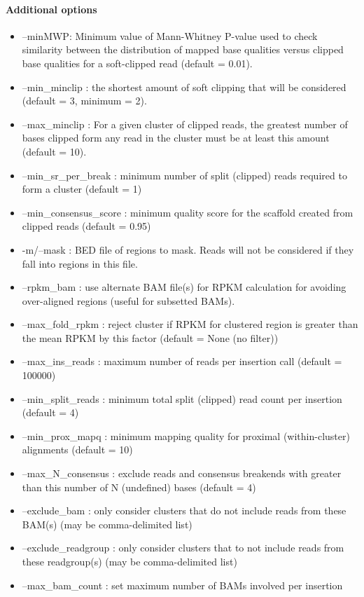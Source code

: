 \documentclass[letterpaper,11pt]{article}
\begin{document}
\paragraph{Additional options}
\begin{itemize}
\item --minMWP: Minimum value of Mann-Whitney P-value used to check similarity between the distribution of mapped base qualities versus clipped base qualities for a soft-clipped read (default = 0.01).
\item --min\_minclip : the shortest amount of soft clipping that will be considered (default = 3, minimum = 2).
\item --max\_minclip : For a given cluster of clipped reads, the greatest number of bases clipped form any read in the cluster must be at least this amount (default = 10).
\item --min\_sr\_per\_break : minimum number of split (clipped) reads required to form a cluster (default = 1)
\item --min\_consensus\_score : minimum quality score for the scaffold created from clipped reads (default = 0.95)
\item -m/--mask : BED file of regions to mask. Reads will not be considered if they fall into regions in this file.
\item --rpkm\_bam : use alternate BAM file(s) for RPKM calculation for avoiding over-aligned regions (useful for subsetted BAMs).
\item --max\_fold\_rpkm : reject cluster if RPKM for clustered region is greater than the mean RPKM by this factor (default = None (no filter))
\item --max\_ins\_reads : maximum number of reads per insertion call (default = 100000)
\item --min\_split\_reads : minimum total split (clipped) read count per insertion (default = 4)
\item --min\_prox\_mapq : minimum mapping quality for proximal (within-cluster) alignments (default = 10)
\item --max\_N\_consensus : exclude reads and consensus breakends with greater than this number of N (undefined) bases (default = 4)
\item --exclude\_bam : only consider clusters that do not include reads from these BAM(s) (may be comma-delimited list)
\item --exclude\_readgroup : only consider clusters that to not include reads from these readgroup(s) (may be comma-delimited list)
\item --max\_bam\_count : set maximum number of BAMs involved per insertion

\end{itemize}
\end{document}
